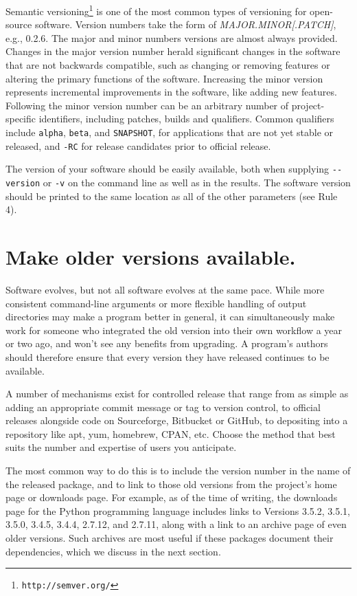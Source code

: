 \documentclass[10pt,letterpaper]{article}
\newcommand{\withurl}[2]{{#1}\footnote{\texttt{#2}}}
\begin{document}
\withurl{Semantic versioning}{http://semver.org/} is one of the most common
types of versioning for open-source software. Version numbers take the
form of \emph{MAJOR.MINOR{[}.PATCH{]}}, e.g., 0.2.6. The major and
minor numbers versions are almost always provided. Changes in the major
version number herald significant changes in the software that are not
backwards compatible, such as changing or removing features or altering
the primary functions of the software. Increasing the minor version
represents incremental improvements in the software, like adding new
features. Following the minor version number can be an arbitrary number
of project-specific identifiers, including patches, builds and qualifiers.
Common qualifiers include \texttt{alpha}, \texttt{beta}, and \texttt{SNAPSHOT},
for applications that are
not yet stable or released, and \texttt{-RC} for release candidates prior
to official release.

The version of your software should be easily available, both when
supplying \texttt{-\/-version} or \texttt{-v} on the command line as
well as in the results. The software version should be printed to the
same location as all of the other parameters (see Rule 4).

\section{Make older versions available.}

Software evolves, but not all software evolves at the same pace.
While more consistent command-line arguments
or more flexible handling of output directories
may make a program better in general,
it can simultaneously make work for someone
who integrated the old version into their own workflow a year or two ago,
and won't see any benefits from upgrading.
A program's authors should therefore ensure that every version they have released
continues to be available.

A number of mechanisms exist for
controlled release that range from as simple as adding an appropriate
commit message or tag to version control, to official releases alongside
code on Sourceforge, Bitbucket or GitHub, to depositing into a
repository like apt, yum, homebrew, CPAN, etc. Choose the method that
best suits the number and expertise of users you anticipate.

The most common way to do this is to include the version number in the
name of the released package, and to link to those old versions from
the project's home page or downloads page.
For example,
as of the time of writing,
the downloads page for the Python programming language includes links to
Versions 3.5.2, 3.5.1, 3.5.0, 3.4.5, 3.4.4, 2.7.12, and 2.7.11,
along with a link to an archive page of even older versions.
Such archives are most useful if these packages document their dependencies,
which we discuss in the next section.
\end{document}
